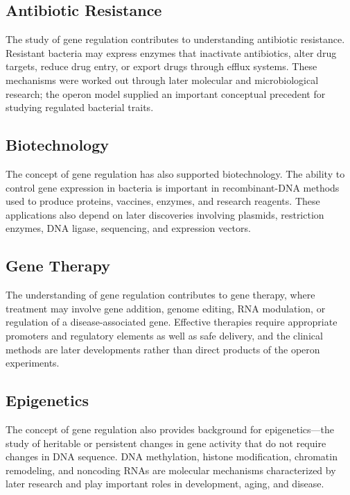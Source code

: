 \subsection{Antibiotic Resistance}

The study of gene regulation contributes to understanding antibiotic resistance. Resistant bacteria may express enzymes that inactivate antibiotics, alter drug targets, reduce drug entry, or export drugs through efflux systems. These mechanisms were worked out through later molecular and microbiological research; the operon model supplied an important conceptual precedent for studying regulated bacterial traits.

\subsection{Biotechnology}

The concept of gene regulation has also supported biotechnology. The ability to control gene expression in bacteria is important in recombinant-DNA methods used to produce proteins, vaccines, enzymes, and research reagents. These applications also depend on later discoveries involving plasmids, restriction enzymes, DNA ligase, sequencing, and expression vectors.

\subsection{Gene Therapy}

The understanding of gene regulation contributes to gene therapy, where treatment may involve gene addition, genome editing, RNA modulation, or regulation of a disease-associated gene. Effective therapies require appropriate promoters and regulatory elements as well as safe delivery, and the clinical methods are later developments rather than direct products of the operon experiments.

\subsection{Epigenetics}

The concept of gene regulation also provides background for epigenetics---the study of heritable or persistent changes in gene activity that do not require changes in DNA sequence. DNA methylation, histone modification, chromatin remodeling, and noncoding RNAs are molecular mechanisms characterized by later research and play important roles in development, aging, and disease.

